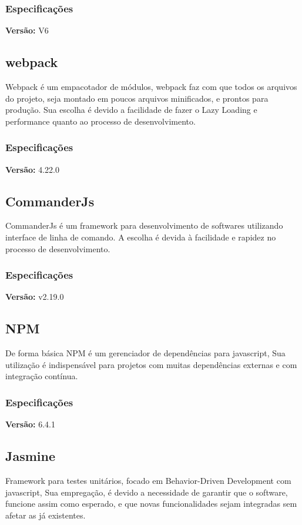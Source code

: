 \subsubsection{Especificações}
\textbf{Versão: } V6

\subsection{webpack}
\par Webpack  é um empacotador de módulos, webpack faz com que todos os arquivos do projeto, seja montado em poucos arquivos minificados, 
e prontos para produção. Sua escolha é devido a facilidade de fazer o Lazy Loading e performance quanto ao processo de desenvolvimento.

\subsubsection{Especificações}
\textbf{Versão: } 4.22.0

\subsection{CommanderJs}
CommanderJs é um framework para desenvolvimento de softwares utilizando interface de linha de comando. A escolha é devida à facilidade e rapidez no processo de desenvolvimento.

\subsubsection{Especificações}
\textbf{Versão: } v2.19.0

\subsection{NPM}
De forma básica NPM é um gerenciador de  dependências para javascript, Sua utilização é indispensável para projetos com muitas dependências 
externas e com integração contínua.

\subsubsection{Especificações}
\textbf{Versão: } 6.4.1

\subsection{Jasmine}
Framework para testes unitários, focado em Behavior-Driven Development com javascript, Sua empregação, é devido a necessidade de garantir que o software, 
funcione assim como esperado, e que novas funcionalidades sejam integradas sem afetar as já existentes.

